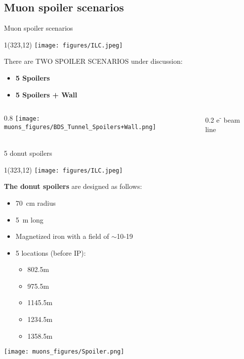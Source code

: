 \documentclass[xcolor={dvipsnames}]{beamer}
\newcommand{\ilclogo}{
  \setlength{\TPHorizModule}{1pt}
  \setlength{\TPVertModule}{1pt}
  \begin{textblock}{1}(323,12)
   \texttt{[image: figures/ILC.jpeg]}
  \end{textblock}
}
\begin{document}
\subsection{Muon spoiler scenarios}
\begin{frame}{Muon spoiler scenarios}
\ilclogo
There are TWO SPOILER SCENARIOS under discussion:
\begin{itemize}
 \item \textbf{5 Spoilers}
 \item \textbf{5 Spoilers + Wall}
\end{itemize}

\begin{columns}[b]
 \begin{column}{0.8\textwidth}
 \flushright
\texttt{[image: muons\_figures/BDS\_Tunnel\_Spoilers+Wall.png]}
\end{column}
 \begin{column}{0.2\textwidth}
 \flushleft
e\textsuperscript{-} beam line
\vspace*{0.55cm}
\end{column}
\end{columns}
\end{frame}

\begin{frame}{5 donut spoilers}
\ilclogo
\textbf{The donut spoilers} are designed as follows:
\begin{itemize}
 \item \SI{70}{\centi\meter} radius
 \item \SI{5}{\meter} long
 \item Magnetized iron with a field of $\sim$10-\SI{19}{\kilo\gauss}
 \item 5 locations (before IP):
 \begin{itemize}
  \item 802.5m
  \item 975.5m
  \item 1145.5m
  \item 1234.5m
  \item 1358.5m
 \end{itemize}

\end{itemize}
\begin{center}
\texttt{[image: muons\_figures/Spoiler.png]}
\end{center}
\end{frame}
\end{document}
